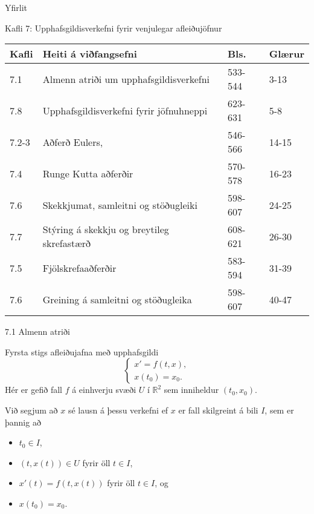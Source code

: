 \date{12., 14. og 19.~mars, 2014}



\begin{frame}
	\maketitle
\end{frame}

\begin{frame}{Yfirlit}
\begin{block}{Kafli 7: Upphafsgildisverkefni fyrir venjulegar afleiðujöfnur}
\begin{center}
\begin{tabular}{|l|l|l|l|}\hline
Kafli &Heiti á viðfangsefni & Bls. & Glærur \\
\hline
7.1 &Almenn atriði um upphafsgildisverkefni & 533-544 & 3-13\\
7.8 & Upphafsgildisverkefni fyrir jöfnuhneppi & 623-631 & 5-8\\
7.2-3 &Aðferð Eulers,  & 546-566 & 14-15\\
7.4 &Runge Kutta aðferðir & 570-578 & 16-23\\
7.6 &Skekkjumat, samleitni og stöðugleiki & 598-607 & 24-25\\
7.7 &Stýring á skekkju og breytileg skrefastærð & 608-621 & 26-30 \\
7.5 &Fjölskrefaaðferðir& 583-594 & 31-39\\
7.6 & Greining á samleitni og stöðugleika&  598-607 & 40-47 \\
\hline
\end{tabular}
\end{center}
\end{block}
\end{frame}


\begin{frame}{7.1 Almenn atriði} 
\begin{block}{Fyrsta stigs afleiðujafna með upphafsgildi}
\begin{equation*}
\begin{cases}
x' = f(t,x),\\
x(t_0) = x_0.
\end{cases}
\end{equation*}
Hér er gefið fall $f$ á einhverju svæði $U$ í $\mathbb{R}^2$ sem
inniheldur $(t_0,x_0)$. 

\pause
\smallskip
Við segjum að $x$ sé lausn á þessu verkefni ef
$x$ er fall skilgreint á bili $I$, sem er þannig að \pause
\begin{itemize}
 \item $t_0 \in I$, \pause
 \item $(t,x(t)) \in U$ fyrir öll $t \in I$, \pause
 \item $x'(t) = f(t,x(t))$ fyrir öll $t \in I$, og\pause
 \item $x(t_0) = x_0$.
\end{itemize}
\end{block}
\end{frame}


